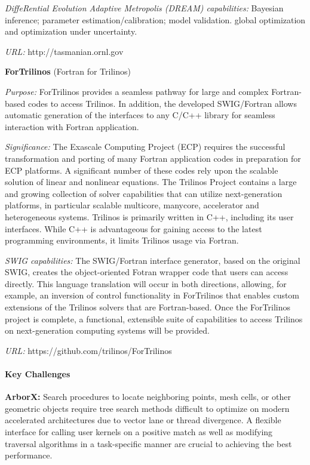 {\it DiffeRential Evolution Adaptive Metropolis (DREAM) capabilities:}
Bayesian inference; parameter estimation/calibration; model validation.
global optimization and optimization under uncertainty.

{\it URL:} http://tasmanian.ornl.gov


{\bf ForTrilinos} (Fortran for Trilinos)

{\it Purpose:} ForTrilinos provides a seamless pathway for large and complex
Fortran-based codes to access Trilinos. In addition, the developed SWIG/Fortran
allows automatic generation of the interfaces to any C/C++ library for seamless
interaction with Fortran application.

{\it Significance:} The Exascale Computing Project (ECP) requires the successful
transformation and porting of many Fortran application codes in preparation for
ECP platforms. A significant number of these codes rely upon the scalable
solution of linear and nonlinear equations. The Trilinos Project contains
a large and growing collection of solver capabilities that can utilize
next-generation platforms, in particular scalable multicore, manycore,
accelerator and heterogeneous systems. Trilinos is primarily written in C++,
including its user interfaces. While C++ is advantageous for gaining access to
the latest programming environments, it limits Trilinos usage via Fortran.

{\it SWIG capabilities:} The SWIG/Fortran interface generator, based on the
original SWIG, creates the object-oriented Fotran wrapper code that users can
access directly. This language translation will occur in both directions,
allowing, for example, an inversion of control functionality in ForTrilinos
that enables custom extensions of the Trilinos solvers that are Fortran-based.
Once the ForTrilinos project is complete, a functional, extensible suite of
capabilities to access Trilinos on next-generation computing systems will be
provided.

{\it URL:} https://github.com/trilinos/ForTrilinos

\paragraph{Key Challenges}

\indent

{\bf ArborX:} Search procedures to locate neighboring points, mesh cells, or
other geometric objects require tree search methods difficult to optimize on
modern accelerated architectures due to vector lane or thread divergence. A
flexible interface for calling user kernels on a positive match as well as
modifying traversal algorithms in a task-specific manner are crucial to
achieving the best performance.

